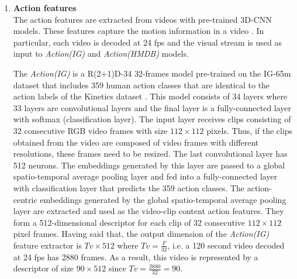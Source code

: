 \documentclass[review]{elsarticle}
\begin{document}
\begin{enumerate}[label = \Alph*.]
\item \textbf{Action features\\}
The action features are extracted from videos with pre-trained 3D-\ac{CNN} models. These features capture the motion information in a video \citep{carreira2017quo}. In particular, each video is decoded at 24 fps and the visual stream is used as input to \textit{Action(IG)} and \textit{Action(HMDB)} models.  

The \textit{Action(IG)} is a R(2+1)D-34 32-frames model \citep{tran2018closer} pre-trained on the IG-65m dataset \citep{ghadiyaram2019large} that includes 359 human action classes that are identical to the action labels of the Kinetics dataset \citep{carreira2017quo}. This model consists of 34 layers where 33 layers are convolutional layers and the final layer is a fully-connected layer with softmax (classification layer). The input layer receives clips consisting of 32 consecutive RGB video frames with size $112\times112$ pixels. Thus, if the clips obtained from the video are composed of video frames with different resolutions, these frames need to be resized. The last convolutional layer has 512 neurons. The embeddings generated by this layer are passed to a global spatio-temporal average pooling layer and fed into a fully-connected layer with classification layer that predicts the 359 action classes. The action-centric embeddings generated by the global spatio-temporal average pooling layer are extracted and used as the video-clip content action features. They form a 512-dimensional descriptor for each clip of 32 consecutive $112\times112$ pixel frames. Having said that, the output dimension of the \textit{Action(IG)} feature extractor is $Tv \times 512$ where $Tv = \frac{F}{32}$, i.e. a 120 second video decoded at 24 fps has 2880 frames. As a result, this video is represented by a descriptor of size $90 \times 512$ since $Tv = \frac{2880}{32} = 90$. 



\end{enumerate}
\end{document}
